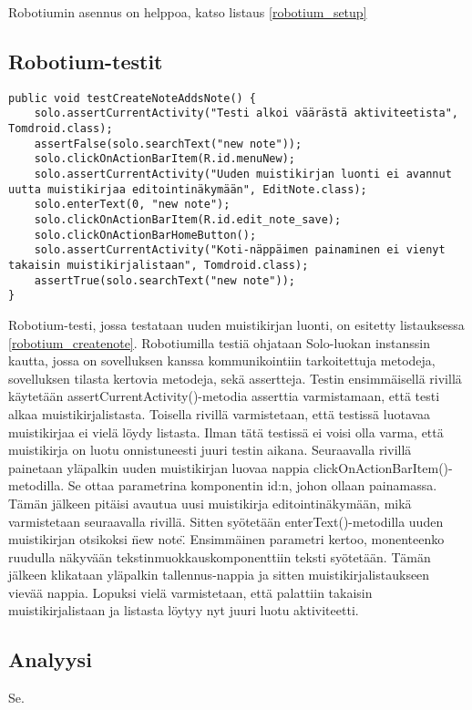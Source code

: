 Robotiumin asennus on helppoa, katso listaus \ref{robotium_setup}

\subsection{Robotium-testit}

\begin{lstlisting}[float,label=robotium_createnote,caption=Muistikirjan luontitesti robotiumilla]
public void testCreateNoteAddsNote() {
	solo.assertCurrentActivity("Testi alkoi väärästä aktiviteetista", Tomdroid.class);
	assertFalse(solo.searchText("new note"));
	solo.clickOnActionBarItem(R.id.menuNew);
	solo.assertCurrentActivity("Uuden muistikirjan luonti ei avannut uutta muistikirjaa editointinäkymään", EditNote.class);
	solo.enterText(0, "new note");
	solo.clickOnActionBarItem(R.id.edit_note_save);
	solo.clickOnActionBarHomeButton();
	solo.assertCurrentActivity("Koti-näppäimen painaminen ei vienyt takaisin muistikirjalistaan", Tomdroid.class);
	assertTrue(solo.searchText("new note"));
}
\end{lstlisting}

Robotium-testi, jossa testataan uuden muistikirjan luonti, on esitetty listauksessa \ref{robotium_createnote}. Robotiumilla testiä ohjataan Solo-luokan instanssin kautta, jossa on sovelluksen kanssa kommunikointiin tarkoitettuja metodeja, sovelluksen tilasta kertovia metodeja, sekä assertteja. Testin ensimmäisellä rivillä käytetään assertCurrentActivity()-metodia asserttia varmistamaan, että testi alkaa muistikirjalistasta. Toisella rivillä varmistetaan, että testissä luotavaa muistikirjaa ei vielä löydy listasta. Ilman tätä testissä ei voisi olla varma, että muistikirja on luotu onnistuneesti juuri testin aikana. Seuraavalla rivillä painetaan yläpalkin uuden muistikirjan luovaa nappia clickOnActionBarItem()-metodilla. Se ottaa parametrina komponentin id:n, johon ollaan painamassa. Tämän jälkeen pitäisi avautua uusi muistikirja editointinäkymään, mikä varmistetaan seuraavalla rivillä. Sitten syötetään enterText()-metodilla uuden muistikirjan otsikoksi \"new note\". Ensimmäinen parametri kertoo, monenteenko ruudulla näkyvään tekstinmuokkauskomponenttiin teksti syötetään. Tämän jälkeen klikataan yläpalkin tallennus-nappia ja sitten muistikirjalistaukseen vievää nappia. Lopuksi vielä varmistetaan, että palattiin takaisin muistikirjalistaan ja listasta löytyy nyt juuri luotu aktiviteetti.

\subsection{Analyysi}

Se.